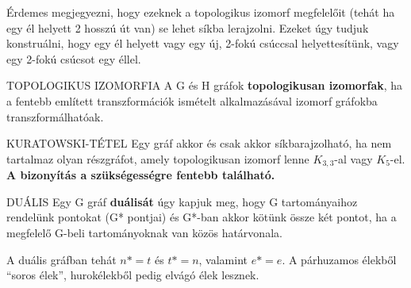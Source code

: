 Érdemes megjegyezni, hogy ezeknek a topologikus izomorf megfelelőit (tehát ha egy él helyett 2 hosszú út van) se lehet síkba lerajzolni. Ezeket úgy tudjuk konstruálni, hogy egy él helyett vagy egy új, 2-fokú csúccsal helyettesítünk, vagy egy 2-fokú csúcsot egy éllel.

\begin{definicio}{TOPOLOGIKUS IZOMORFIA}
A G és H gráfok \textbf{topologikusan izomorfak}, ha a fentebb említett transzformációk ismételt alkalmazásával izomorf gráfokba transzformálhatóak.
\end{definicio}

\begin{tetel}{KURATOWSKI-TÉTEL}
Egy gráf akkor és csak akkor síkbarajzolható, ha nem tartalmaz olyan részgráfot, amely topologikusan izomorf lenne $K_{3,3}$-al vagy $K_5$-el. \textbf{A bizonyítás a szükségességre fentebb található.}
\end{tetel}

\begin{definicio}{DUÁLIS}
Egy G gráf \textbf{duálisát} úgy kapjuk meg, hogy G tartományaihoz rendelünk pontokat (G* pontjai) és G*-ban akkor kötünk össze két pontot, ha a megfelelő G-beli tartományoknak van közös határvonala.
\end{definicio}

A duális gráfban tehát $n* = t$ és $t* = n$, valamint $e* = e$.
A párhuzamos élekből ``soros élek'', hurokélekből pedig elvágó élek lesznek.